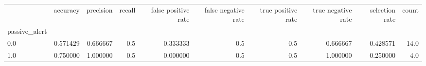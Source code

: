 \begin{tabular}{lrrrrrrrrr}
\toprule
{} &  accuracy &  precision &  recall &  false positive rate &  false negative rate &  true positive rate &  true negative rate &  selection rate &  count \\
passive\_alert &           &            &         &                      &                      &                     &                     &                 &        \\
\midrule
0.0           &  0.571429 &   0.666667 &     0.5 &             0.333333 &                  0.5 &                 0.5 &            0.666667 &        0.428571 &   14.0 \\
1.0           &  0.750000 &   1.000000 &     0.5 &             0.000000 &                  0.5 &                 0.5 &            1.000000 &        0.250000 &    4.0 \\
\bottomrule
\end{tabular}

